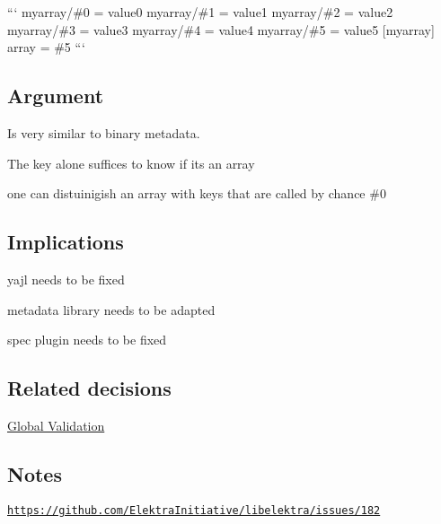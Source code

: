 ``` myarray/\#0 = value0 myarray/\#1 = value1 myarray/\#2 = value2 myarray/\#3 = value3 myarray/\#4 = value4 myarray/\#5 = value5 \mbox{[}myarray\mbox{]} array = \#5 ```

\subsection*{Argument}


\begin{DoxyItemize}
\item Is very similar to {\ttfamily binary} metadata.
\item The key alone suffices to know if its an array
\item one can distuinigish an array with keys that are called by chance \#0
\end{DoxyItemize}

\subsection*{Implications}


\begin{DoxyItemize}
\item yajl needs to be fixed
\item metadata library needs to be adapted
\item spec plugin needs to be fixed
\end{DoxyItemize}

\subsection*{Related decisions}


\begin{DoxyItemize}
\item \hyperlink{doc_decisions_global_validation_md}{Global Validation}
\end{DoxyItemize}

\subsection*{Notes}

\href{https://github.com/ElektraInitiative/libelektra/issues/182}{\tt https\+://github.\+com/\+Elektra\+Initiative/libelektra/issues/182} 